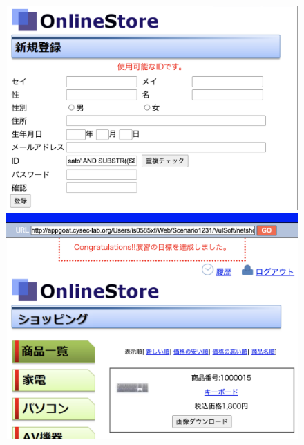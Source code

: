 \documentclass[dvipdfmx,autodetect-engine,titlepage]{jsarticle}
\begin{document}
\begin{figure}[h]
  \centering
  \begin{minipage}[b]{0.45\linewidth}
  \begin{center}
    \includegraphics[keepaspectratio,scale=0.3]{pic22.png}
    \end{center}
    \caption{}
  \end{minipage}
  \begin{minipage}[b]{0.45\linewidth}
  \begin{center}
    \includegraphics[keepaspectratio,scale=0.3]{pic23.png}
    \end{center}
    \caption{}
  \end{minipage}
\end{figure}
\end{document}
